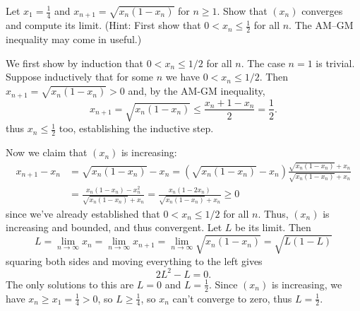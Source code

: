\documentclass[11pt,dvipsnames]{book}
\numberwithin{equation}{section} %
\numberwithin{figure}{section} %
\numberwithin{table}{section} %
\begin{document}
\begin{exercise}
 Let $x_1=\frac{1}{4}$ and $x_{n+1} = \sqrt{x_{n}(1-x_{n})}$ for $n \geq 1$. Show that $(x_n)$ converges and compute its limit. (Hint: First show that $0< x_{n}\leq \frac{1}{2}$ for all $n$. The AM--GM inequality may come in useful.)

\begin{solution}
We first show by induction that $0 < x_n \leq 1/2$ for all $n$. The case $n=1$ is trivial. Suppose inductively that for some $n$ we have $0 < x_n \leq 1/2$. Then $x_{n+1} =\sqrt{x_{n}(1-x_{n})}>0$ and, by the AM-GM inequality,
\[
x_{n+1}=\sqrt{x_{n}(1-x_{n})}\leq \frac{x_{n}+1-x_{n}}{2} = \frac{1}{2}.
\]
thus $x_{n}\leq \frac{1}{2}$ too, establishing the inductive step. 

Now we claim that $(x_{n})$ is increasing:
\begin{align*}
x_{n+1}-x_{n}
& =\sqrt{x_{n}(1-x_{n})}-x_{n} 
= \left(\sqrt{x_{n}(1-x_{n})}-x_{n}\right)\frac{\sqrt{x_{n}(1-x_{n})}+x_{n}}{\sqrt{x_{n}(1-x_{n})}+x_{n}}\\
& = \frac{x_{n}(1-x_{n})-x_{n}^{2}}{\sqrt{x_{n}(1-x_{n})}+x_{n}} 
= \frac{x_{n}(1-2x_{n})}{\sqrt{x_{n}(1-x_{n})}+x_{n}} \geq 0
\end{align*}
since we've already established that $0 < x_n \leq 1/2$ for all $n$. Thus, $(x_{n})$ is increasing and bounded, and thus convergent. Let $L$ be its limit. Then
\[
L=\lim_{n\rightarrow \infty}x_{n}
=\lim_{n\rightarrow \infty}x_{n+1}
=\lim_{n\rightarrow \infty}\sqrt{x_{n}(1-x_{n})}
=\sqrt{L(1-L)}
\]
squaring both sides and moving everything to the left gives
\[
2L^2-L=0.
\]
The only solutions to this are $L=0$ and $L=\frac{1}{2}$. Since $(x_{n})$ is increasing, we have $x_{n}\geq x_{1} = \frac{1}{4}>0$, so $L\geq \frac{1}{4}$, so $x_{n}$ can't converge to zero, thus $L=\frac{1}{2}$. 
\end{solution}
\end{exercise}
\end{document}
